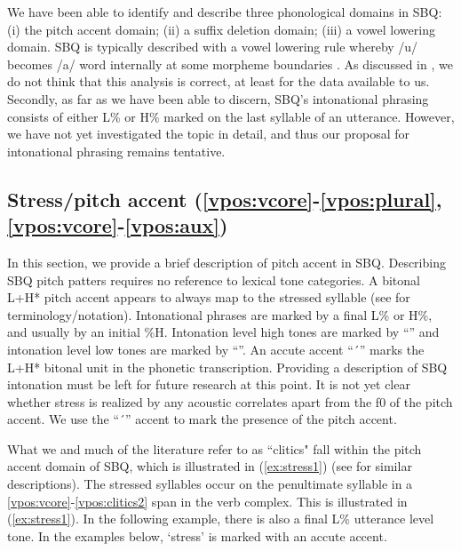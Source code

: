 \documentclass[output=paper]{langscibook}
\begin{document}
We have been able to identify and describe three phonological domains in SBQ: (i) the pitch accent domain; (ii) a suffix deletion domain; (iii) a vowel lowering domain. SBQ is typically described with a vowel lowering rule whereby /u/ becomes /a/ word internally at some morpheme boundaries \citep[]{muysken:1981}. As discussed in , we do not think that this analysis is correct, at least for the data available to us. Secondly, as far as we have been able to discern, SBQ's intonational phrasing consists of either L\% or H\% marked on the last syllable of an utterance. However, we have not yet investigated the topic in detail, and thus our proposal for intonational phrasing remains tentative.

\largerpage[2]
\subsection{Stress/pitch accent (\ref{vpos:vcore}-\ref{vpos:plural}, \ref{vpos:vcore}-\ref{vpos:aux})}
\label{sec:pitchaccentdomain}

In this section, we provide a brief description of pitch accent in SBQ. Describing SBQ pitch patters requires no reference to lexical tone categories. A bitonal L+H* pitch accent appears to always map to the stressed syllable (see \citealt{pierrehumbertbeckman:1986, gussenhovenbruce:1999} for terminology/notation). Intonational phrases are marked by a final L\% or H\%, and usually by an initial \%H. Intonation level high tones are marked by ``\uparrow'' and intonation level low tones are marked by ``\downarrow''. An accute accent ``´'' marks the L+H* bitonal unit in the phonetic transcription. Providing a description of SBQ intonation must be left for future research at this point. It is not yet clear whether stress is realized by any acoustic correlates apart from the f0 of the pitch accent. We use the ``´'' accent to mark the presence of the pitch accent.

What we and much of the literature refer to as ``clitics" fall within the pitch accent domain of SBQ, which is illustrated in (\ref{ex:stress1}) (see \citealt{bills1971introdution, herrerosanchez:gramaticaquechua:1978, adelaar1977:tarmaquechua, cerronpalominoquechua:1994} for similar descriptions). The stressed syllables occur on the penultimate syllable in a \ref{vpos:vcore}-\ref{vpos:clitics2} span in the verb complex. This is illustrated in (\ref{ex:stress1}). In the following example, there is also a final L\% utterance level tone. In the examples below, `stress' is marked with an accute accent.
\end{document}

